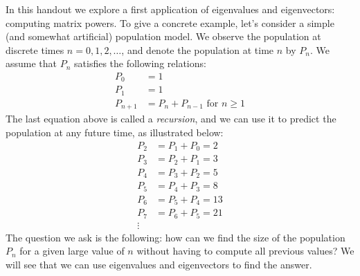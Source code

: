 \documentclass[12pt]{article}
\begin{document}
In this handout we explore a first application of eigenvalues and eigenvectors: computing matrix powers. To give a concrete example, let's consider a simple (and somewhat artificial) population model. We observe the population at discrete times $n=0,1,2,\ldots$, and denote the population at time $n$ by $P_n$. We assume that $P_n$ satisfies the following relations:
\begin{align*}
P_0&=1\\
P_1&=1\\
P_{n+1}&=P_{n}+P_{n-1}\text{ for $n\ge1$}
\end{align*}
The last equation above is called a \emph{recursion}, and we can use it to predict the population at any future time, as illustrated below:
\begin{align*}
P_2&=P_1+P_0=2\\
P_3&=P_2+P_1=3\\
P_4&=P_3+P_2=5\\
P_5&=P_4+P_3=8\\
P_6&=P_5+P_4=13\\
P_7&=P_6+P_5=21\\
\vdots&
\end{align*}
The question we ask is the following: how can we find the size of the population $P_n$ for a given large  value  of $n$ without having to compute all previous values? We will see that we can use eigenvalues and eigenvectors to find the answer.
\end{document}
